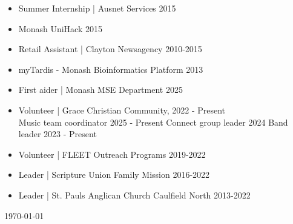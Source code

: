 \documentclass[10pt,a4paper,ragged2e,withhyper]{altacv}
\begin{document}
	\newcommand*{\phonesym}{\color{accent}\faPhone}
	\newcommand*{\phonenumber}[1]{\href{tel:#1}{#1}}
	\newcommand*{\mailsym}{{\color{accent}\small\normalfont\mailaddresssymbol}}
	\newcommand*{\mailto}[1]{\href{mailto:#1}{#1}}
	\newcommand*{\mailtoshort}[2]{\href{mailto:#2}{#1}}
	\newcommand*{\buildingsym}{\color{accent}\faBuilding}
	\newcommand*{\LIsym}{\color{accent}\faLinkedin}
	\newcommand*{\LIprofile}[2]{\href{https://linkedin.com/in/#1}{#2}}
	
	\begin{multicols}{2}
		\begin{itemize}
			\item Summer Internship | Ausnet Services 2015
			\item Monash UniHack 2015
			\item Retail Assistant | Clayton Newsagency 2010-2015
			\item myTardis - Monash Bioinformatics Platform 2013
		\end{itemize}
	\end{multicols}
	
	\vspace{-1em}
	\begin{multicols}{2}
		\begin{itemize}
			\item First aider | Monash MSE Department 2025
			\item Volunteer | Grace Christian Community, 2022 - Present\\
				\subitem Music team coordinator 2025 - Present
				\subitem Connect group leader 2024
				\subitem Band leader 2023 - Present
			\item Volunteer | FLEET Outreach Programs 2019-2022
			\item Leader | Scripture Union Family Mission 2016-2022\\
			\item Leader | St. Pauls Anglican Church Caulfield North 2013-2022
		\end{itemize}
	\end{multicols}

\vspace{4em}


\centering
\today

\end{document}
